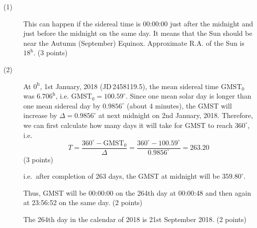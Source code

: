 \begin{description}
\item[(1)] This can happen if the sidereal time is 00:00:00 just after the
  midnight and just before the midnight on the same day. It means that the Sun
  should be near the Autumn (September) Equinox. Approximate R.A. of the Sun is
  $18^{\mathrm{h}}$.
  \hfill(3 points)
\item[(2)] At $0^{\mathrm{h}}$, 1st January, 2018 (JD\,2458119.5), the mean
  sidereal time $\mathrm{GMST}_0$ was $6.706^{\mathrm{h}}$, i.e.
  $\mathrm{GMST}_0 = 100.59^\circ$. Since one mean solar day is longer than one
  mean sidereal day by $0.9856^\circ$ (about 4 minutes), the GMST will increase
  by $\Delta = 0.9856^\circ$ at next midnight on 2nd January, 2018. Therefore,
  we can first calculate how many days it will take for GMST to reach
  $360^\circ$, i.e.
  \[
    T = \frac{360^\circ - \mathrm{GMST}_0}{\Delta}
      = \frac{360^\circ - 100.59^\circ}{0.9856^\circ} = 263.20
  \]
  \hfill(3 points)

  i.e.\ after completion of 263 days, the GMST at midnight will be
  $359.80^\circ$.

  Thus, GMST will be 00:00:00 on the 264th day at 00:00:48 and then again at
  23:56:52 on the same day. \hfill(2 points)

  The 264th day in the calendar of 2018 is 21st September 2018.
  \hfill(2 points)
\end{description}
